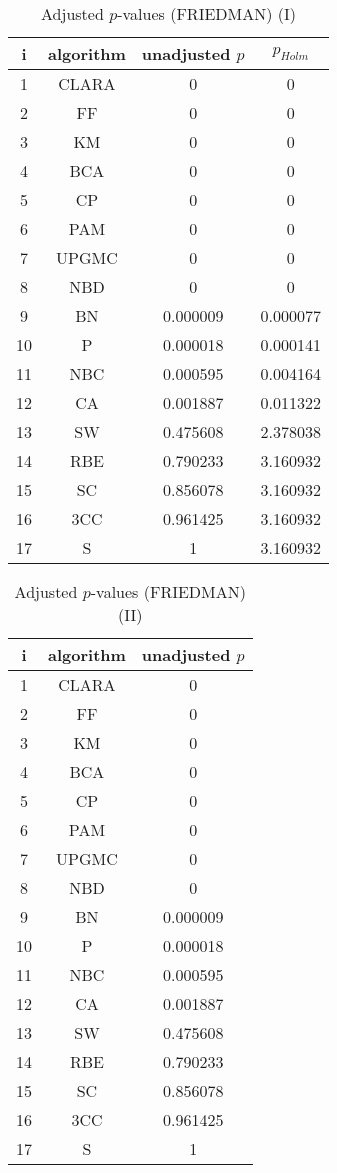 \documentclass[a4paper,10pt]{article}
\begin{document}
\begin{landscape}
\begin{table}[!htp]
\centering\small
\begin{tabular}{cccc}
i&algorithm&unadjusted $p$&$p_{Holm}$\\
\hline1&CLARA&0&0\\2&FF&0&0\\3&KM&0&0\\4&BCA&0&0\\5&CP&0&0\\6&PAM&0&0\\7&UPGMC&0&0\\8&NBD&0&0\\9&BN&0.000009&0.000077\\10&P&0.000018&0.000141\\11&NBC&0.000595&0.004164\\12&CA&0.001887&0.011322\\13&SW&0.475608&2.378038\\14&RBE&0.790233&3.160932\\15&SC&0.856078&3.160932\\16&3CC&0.961425&3.160932\\17&S&1&3.160932\\\hline
\end{tabular}
\caption{Adjusted $p$-values (FRIEDMAN) (I)}
\end{table}
\begin{table}[!htp]
\centering\small
\begin{tabular}{ccc}
i&algorithm&unadjusted $p$\\
\hline1&CLARA&0\\2&FF&0\\3&KM&0\\4&BCA&0\\5&CP&0\\6&PAM&0\\7&UPGMC&0\\8&NBD&0\\9&BN&0.000009\\10&P&0.000018\\11&NBC&0.000595\\12&CA&0.001887\\13&SW&0.475608\\14&RBE&0.790233\\15&SC&0.856078\\16&3CC&0.961425\\17&S&1\\\hline
\end{tabular}
\caption{Adjusted $p$-values (FRIEDMAN) (II)}
\end{table}

\newpage
\end{landscape}
\end{document}
